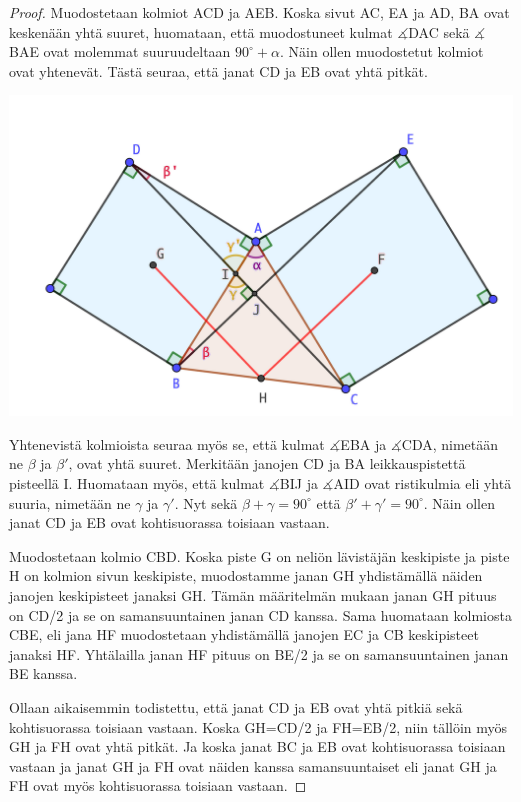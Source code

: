 \documentclass{scrartcl}
\begin{document}
\begin{proof}
Muodostetaan kolmiot ACD ja AEB. Koska sivut AC, EA ja AD, BA ovat keskenään yhtä suuret, huomataan, että muodostuneet kulmat $\measuredangle$DAC sekä $\measuredangle$BAE ovat molemmat suuruudeltaan $90^\circ + \alpha$. Näin ollen muodostetut kolmiot ovat yhtenevät. Tästä seuraa, että janat CD ja EB ovat yhtä pitkät.
\begin{center}
    \includegraphics[scale=0.6]{kolmiojatkoa}
\end{center}

Yhtenevistä kolmioista seuraa myös se, että kulmat $\measuredangle$EBA ja $\measuredangle$CDA, nimetään ne $\beta$ ja $\beta'$, ovat yhtä suuret. Merkitään janojen CD ja BA leikkauspistettä pisteellä I. Huomataan myös, että kulmat $\measuredangle$BIJ ja $\measuredangle$AID ovat ristikulmia eli yhtä suuria, nimetään ne $\gamma$ ja $\gamma'$. Nyt sekä $\beta + \gamma = 90^\circ$ että $\beta' + \gamma' = 90^\circ$. Näin ollen janat CD ja EB ovat kohtisuorassa toisiaan vastaan.

Muodostetaan kolmio CBD. Koska piste G on neliön lävistäjän keskipiste ja piste H on kolmion sivun keskipiste, muodostamme janan GH yhdistämällä näiden janojen keskipisteet janaksi GH. Tämän määritelmän mukaan janan GH pituus on CD/2 ja se on samansuuntainen janan CD kanssa. Sama huomataan kolmiosta CBE, eli jana HF muodostetaan yhdistämällä janojen EC ja CB keskipisteet janaksi HF. Yhtälailla janan HF pituus on BE/2 ja se on samansuuntainen janan BE kanssa.

Ollaan aikaisemmin todistettu, että janat CD ja EB ovat yhtä pitkiä sekä kohtisuorassa toisiaan vastaan. Koska GH=CD/2 ja FH=EB/2, niin tällöin myös GH ja FH ovat yhtä pitkät. Ja koska janat BC ja EB ovat kohtisuorassa toisiaan vastaan ja janat GH ja FH ovat näiden kanssa samansuuntaiset eli janat GH ja FH ovat myös kohtisuorassa toisiaan vastaan.
\end{proof}
\end{document}

